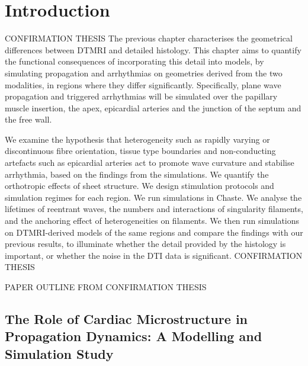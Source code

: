 \section{Introduction}
\label{sec:review:introduction}
CONFIRMATION THESIS
The previous chapter characterises the geometrical differences between DTMRI and detailed histology. This chapter aims to quantify the functional consequences of incorporating this detail into models, by simulating propagation and arrhythmias on geometries derived from the two modalities, in regions where they differ significantly. Specifically, plane wave propagation and triggered arrhythmias will be simulated over the papillary muscle insertion, the apex, epicardial arteries and the junction of the septum and the free wall.

We examine the hypothesis that heterogeneity such as rapidly varying or discontinuous fibre orientation, tissue type boundaries and non-conducting artefacts such as epicardial arteries act to promote wave curvature and stabilise arrhythmia, based on the findings from the simulations. We quantify the orthotropic effects of sheet structure. We design stimulation protocols and simulation regimes for each region. We run simulations in Chaste. We analyse the lifetimes of reentrant waves, the numbers and interactions of singularity filaments, and the anchoring effect of heterogeneities on filaments. We then run simulations on DTMRI-derived models of the same regions and compare the findings with our previous results, to illuminate whether the detail provided by the histology is important, or whether the noise in the DTI data is significant.
CONFIRMATION THESIS

PAPER OUTLINE FROM CONFIRMATION THESIS
\subsection{The Role of Cardiac Microstructure in Propagation Dynamics: A Modelling and Simulation Study}
